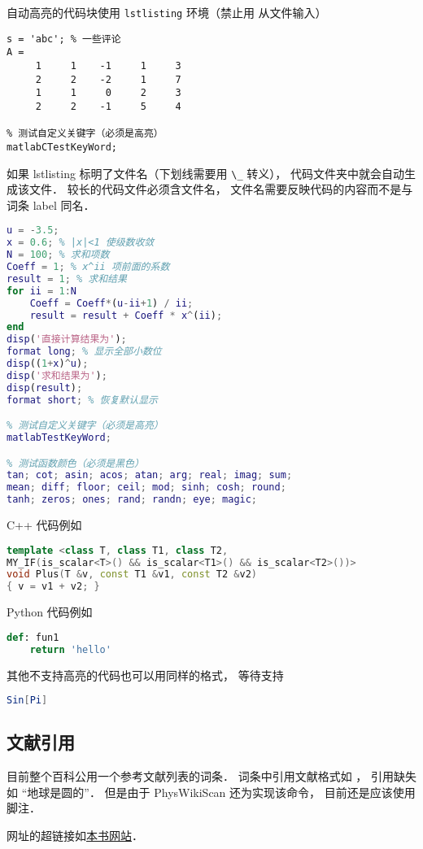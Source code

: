 自动高亮的代码块使用 \verb|lstlisting| 环境（禁止用 \verb|| 从文件输入）
\begin{lstlisting}[language=matlabC]
s = 'abc'; % 一些评论
A =
     1     1    -1     1     3
     2     2    -2     1     7
     1     1     0     2     3
     2     2    -1     5     4

% 测试自定义关键字（必须是高亮）
matlabCTestKeyWord;
\end{lstlisting}

如果 lstlisting 标明了文件名（下划线需要用 \verb|\_| 转义）， 代码文件夹中就会自动生成该文件． 较长的代码文件必须含文件名， 文件名需要反映代码的内容而不是与词条 label 同名．

\begin{lstlisting}[language=matlab, caption=sample\_code.m]
% 验证二项式定理(非整数幂)
u = -3.5;
x = 0.6; % |x|<1 使级数收敛
N = 100; % 求和项数
Coeff = 1; % x^ii 项前面的系数
result = 1; % 求和结果
for ii = 1:N
    Coeff = Coeff*(u-ii+1) / ii;
    result = result + Coeff * x^(ii);
end
disp('直接计算结果为');
format long; % 显示全部小数位
disp((1+x)^u);
disp('求和结果为');
disp(result);
format short; % 恢复默认显示

% 测试自定义关键字（必须是高亮）
matlabTestKeyWord;

% 测试函数颜色（必须是黑色）
tan; cot; asin; acos; atan; arg; real; imag; sum;
mean; diff; floor; ceil; mod; sinh; cosh; round;
tanh; zeros; ones; rand; randn; eye; magic;
\end{lstlisting}

C++ 代码例如
\begin{lstlisting}[language=cpp]
template <class T, class T1, class T2,
MY_IF(is_scalar<T>() && is_scalar<T1>() && is_scalar<T2>())>
void Plus(T &v, const T1 &v1, const T2 &v2)
{ v = v1 + v2; }
\end{lstlisting}

Python 代码例如
\begin{lstlisting}[language=python]
def: fun1
	return 'hello'
\end{lstlisting}

其他不支持高亮的代码也可以用同样的格式， 等待支持
\begin{lstlisting}[language=mathematica]
Sin[Pi]
\end{lstlisting}

\subsection{文献引用}
目前整个百科公用一个参考文献列表的词条． 词条中引用文献格式如 \cite{PhysWiki}， 引用缺失如 “地球是圆的\needCite”． 但是由于 PhysWikiScan 还为实现该命令， 目前还是应该使用脚注．

网址的超链接如\href{https://wuli.wiki}{本书网站}．
